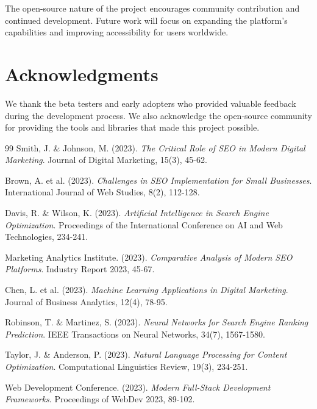\documentclass[11pt,a4paper]{article}
\begin{document}
The open-source nature of the project encourages community contribution and continued development. Future work will focus on expanding the platform's capabilities and improving accessibility for users worldwide.

\section*{Acknowledgments}

We thank the beta testers and early adopters who provided valuable feedback during the development process. We also acknowledge the open-source community for providing the tools and libraries that made this project possible.

\begin{thebibliography}{99}
Smith, J. \& Johnson, M. (2023). 
\textit{The Critical Role of SEO in Modern Digital Marketing}. 
Journal of Digital Marketing, 15(3), 45-62.

Brown, A. et al. (2023).
\textit{Challenges in SEO Implementation for Small Businesses}.
International Journal of Web Studies, 8(2), 112-128.

Davis, R. \& Wilson, K. (2023).
\textit{Artificial Intelligence in Search Engine Optimization}.
Proceedings of the International Conference on AI and Web Technologies, 234-241.

Marketing Analytics Institute. (2023).
\textit{Comparative Analysis of Modern SEO Platforms}.
Industry Report 2023, 45-67.

Chen, L. et al. (2023).
\textit{Machine Learning Applications in Digital Marketing}.
Journal of Business Analytics, 12(4), 78-95.

Robinson, T. \& Martinez, S. (2023).
\textit{Neural Networks for Search Engine Ranking Prediction}.
IEEE Transactions on Neural Networks, 34(7), 1567-1580.

Taylor, J. \& Anderson, P. (2023).
\textit{Natural Language Processing for Content Optimization}.
Computational Linguistics Review, 19(3), 234-251.

Web Development Conference. (2023).
\textit{Modern Full-Stack Development Frameworks}.
Proceedings of WebDev 2023, 89-102.
\end{thebibliography}
\end{document}
